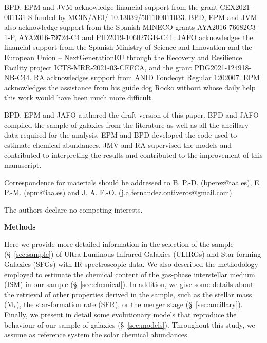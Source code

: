 \documentclass{nature2}
\begin{document}
\begin{addendum} 

\item[Acknowledgements]
BPD, EPM and JVM acknowledge financial support from the grant CEX2021-001131-S funded by MCIN/AEI/ 10.13039/501100011033. BPD, EPM and JVM also acknowledge support from the Spanish MINECO grants AYA2016-76682C3-1-P, AYA2016-79724-C4 and PID2019-106027GB-C41. JAFO acknowledges the financial support from the Spanish Ministry of Science and Innovation and the European Union -- NextGenerationEU through the Recovery and Resilience Facility project ICTS-MRR-2021-03-CEFCA, and the grant PDG2021-124918-NB-C44. RA acknowledges support from ANID Fondecyt Regular 1202007. EPM acknowledges the assistance from his guide dog Rocko without whose daily help this work would have been much more difficult.

\item[Author Contributions] {BPD, EPM and JAFO authored the draft version of this paper. BPD and JAFO compiled the sample of galaxies from the literature as well as all the ancillary data required for the analysis. EPM and BPD developed the code used to estimate chemical abundances. JMV and RA supervised the models and contributed to interpreting the results and contributed to the improvement of this manuscript.}


\item[Correspondence] 
{Correspondence for materials should
be addressed to B. P.-D. (bperez@iaa.es), E. P.-M. (epm@iaa.es) and J. A. F.-O. (j.a.fernandez.ontiveros@gmail.com)}

\item[Competing interests statement] The authors declare no competing interests.
 

\end{addendum}

\clearpage

\begin{center}
{\bf \large Methods}
\end{center}
\vspace{-0.6cm}

Here we provide more detailed information in the selection of the sample (\S~\ref{sec:sample}) of Ultra-Luminous Infrared Galaxies (ULIRGs) and Star-forming Galaxies (SFGs) with IR spectroscopic data. We also described the methodology employed to estimate the chemical content of the gas-phase interstellar medium (ISM) in our sample (\S~\ref{sec:chemical}). In addition, we give some details about the retrieval of other properties derived in the sample, such as the stellar mass (M\ensuremath{_{*}}), the star-formation rate (SFR), or the merger stage (\S~\ref{sec:ancillary}). Finally, we present in detail some evolutionary models that reproduce the behaviour of our sample of galaxies (\S~\ref{sec:models}). Throughout this study, we assume as reference system the solar chemical abundances\cite{Lodders_2021}.
\end{document}
